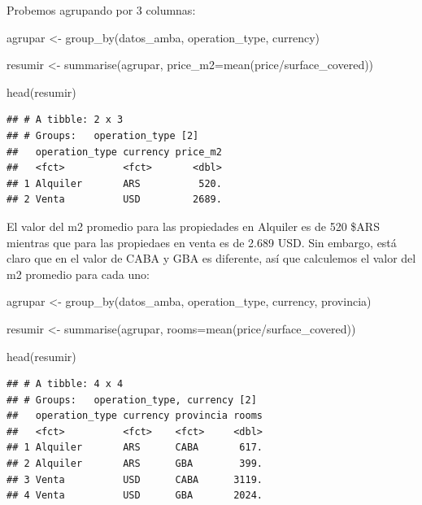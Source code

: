 \documentclass[
  spanish,
]{book}
\newenvironment{Shaded}{\begin{snugshade}}{\end{snugshade}}
\newcommand{\AttributeTok}[1]{\textcolor[rgb]{0.77,0.63,0.00}{#1}}
\newcommand{\FunctionTok}[1]{\textcolor[rgb]{0.00,0.00,0.00}{#1}}
\newcommand{\NormalTok}[1]{#1}
\newcommand{\OtherTok}[1]{\textcolor[rgb]{0.56,0.35,0.01}{#1}}
\newcommand{\SpecialCharTok}[1]{\textcolor[rgb]{0.00,0.00,0.00}{#1}}
\begin{document}
Probemos agrupando por 3 columnas:

\begin{Shaded}
\begin{Highlighting}[]
\NormalTok{agrupar }\OtherTok{\textless{}{-}} \FunctionTok{group\_by}\NormalTok{(datos\_amba, operation\_type, currency)}

\NormalTok{resumir }\OtherTok{\textless{}{-}} \FunctionTok{summarise}\NormalTok{(agrupar, }\AttributeTok{price\_m2=}\FunctionTok{mean}\NormalTok{(price}\SpecialCharTok{/}\NormalTok{surface\_covered))}

\FunctionTok{head}\NormalTok{(resumir)}
\end{Highlighting}
\end{Shaded}

\begin{verbatim}
## # A tibble: 2 x 3
## # Groups:   operation_type [2]
##   operation_type currency price_m2
##   <fct>          <fct>       <dbl>
## 1 Alquiler       ARS          520.
## 2 Venta          USD         2689.
\end{verbatim}

El valor del m2 promedio para las propiedades en Alquiler es de 520 \$ARS mientras que para las propiedaes en venta es de 2.689 USD. Sin embargo, está claro que en el valor de CABA y GBA es diferente, así que calculemos el valor del m2 promedio para cada uno:

\begin{Shaded}
\begin{Highlighting}[]
\NormalTok{agrupar }\OtherTok{\textless{}{-}} \FunctionTok{group\_by}\NormalTok{(datos\_amba, operation\_type, currency, provincia)}

\NormalTok{resumir }\OtherTok{\textless{}{-}} \FunctionTok{summarise}\NormalTok{(agrupar, }\AttributeTok{rooms=}\FunctionTok{mean}\NormalTok{(price}\SpecialCharTok{/}\NormalTok{surface\_covered))}

\FunctionTok{head}\NormalTok{(resumir)}
\end{Highlighting}
\end{Shaded}

\begin{verbatim}
## # A tibble: 4 x 4
## # Groups:   operation_type, currency [2]
##   operation_type currency provincia rooms
##   <fct>          <fct>    <fct>     <dbl>
## 1 Alquiler       ARS      CABA       617.
## 2 Alquiler       ARS      GBA        399.
## 3 Venta          USD      CABA      3119.
## 4 Venta          USD      GBA       2024.
\end{verbatim}
\end{document}

